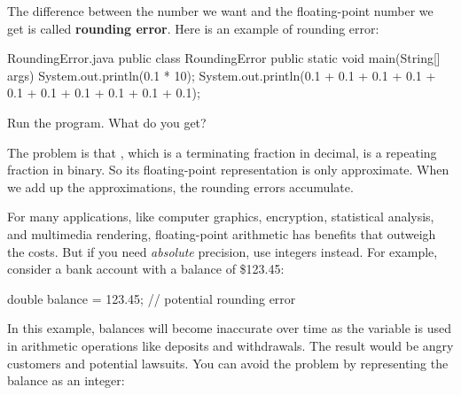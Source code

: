 

The difference between the number we want and the floating-point number we get is called {\bf rounding error}.
Here is an example of rounding error:
\begin{trinket}[210]{RoundingError.java}
public class RoundingError {
    public static void main(String[] args) {
       System.out.println(0.1 * 10);
       System.out.println(0.1 + 0.1 + 0.1 + 0.1 + 0.1
                 + 0.1 + 0.1 + 0.1 + 0.1 + 0.1);
    }
}
\end{trinket}

Run the program.  What do you get?

%
%
%

The problem is that , which is a terminating fraction in decimal, is a repeating fraction in binary.
So its floating-point representation is only approximate.
When we add up the approximations, the rounding errors accumulate.

For many applications, like computer graphics, encryption, statistical analysis, and multimedia rendering, floating-point arithmetic has benefits that outweigh the costs.
But if you need {\em absolute} precision, use integers instead.
For example, consider a bank account with a balance of \$123.45:

\begin{code}
double balance = 123.45;  // potential rounding error
\end{code}

In this example, balances will become inaccurate over time as the variable is used in arithmetic operations like deposits and withdrawals.
The result would be angry customers and potential lawsuits.
You can avoid the problem by representing the balance as an integer:

